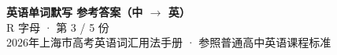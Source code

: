 \documentclass[10pt,a4paper]{article}
\begin{document}
\pagestyle{plain}

\begin{center}
{\LARGE\bfseries 英语单词默写 \quad 参考答案（中 $\to$ 英）}\\[0.22em]
{\large R 字母 · 第 3 / 5 份}\\[0.18em]
{\small 2026年上海市高考英语词汇用法手册 · 参照普通高中英语课程标准}
\end{center}

\vspace{0.2em}
\noindent{\color{rulegray}\rule{\textwidth}{0.8pt}}

\vspace{0.35em}

\vspace{0.25em}
\renewcommand{\arraystretch}{1.32}
\end{document}
